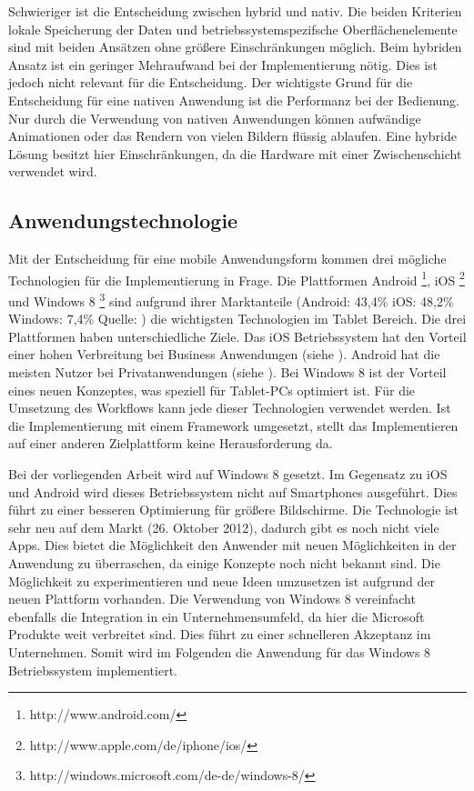 Schwieriger ist die Entscheidung zwischen hybrid und nativ. Die beiden Kriterien lokale Speicherung der Daten und betriebssystemspezifsche Oberflächenelemente sind mit beiden Ansätzen ohne größere Einschränkungen möglich. Beim hybriden Ansatz ist ein geringer Mehraufwand bei der Implementierung nötig. Dies ist jedoch nicht relevant für die Entscheidung. Der wichtigste Grund für die Entscheidung für eine nativen Anwendung ist die Performanz bei der Bedienung. Nur durch die Verwendung von nativen Anwendungen können aufwändige Animationen oder das Rendern von vielen Bildern flüssig ablaufen. Eine hybride Lösung besitzt hier Einschränkungen, da die Hardware mit einer Zwischenschicht verwendet wird.

\subsection{Anwendungstechnologie}
Mit der Entscheidung für eine mobile Anwendungsform kommen drei mögliche Technologien für die Implementierung in Frage. Die Plattformen Android \footnote{http://www.android.com/}, iOS \footnote{http://www.apple.com/de/iphone/ios/} und Windows 8 \footnote{http://windows.microsoft.com/de-de/windows-8/} sind aufgrund ihrer Marktanteile (Android: 43,4\% iOS: 48,2\% Windows: 7,4\% Quelle: \cite{bib:marktanteilBS} ) die wichtigsten Technologien im Tablet Bereich. Die drei Plattformen haben unterschiedliche Ziele. Das iOS Betriebssystem hat den Vorteil einer hohen Verbreitung bei Business Anwendungen (siehe \cite[S.5]{bib:mobileMarketing2}). Android hat die meisten Nutzer bei Privatanwendungen (siehe \cite{bib:marktanteilMBS}). Bei Windows 8 ist der Vorteil eines neuen Konzeptes, was speziell für Tablet-PCs optimiert ist. Für die Umsetzung des Workflows kann jede dieser Technologien verwendet werden. Ist die Implementierung mit einem Framework umgesetzt, stellt das Implementieren auf einer anderen Zielplattform keine Herausforderung da. \par 

Bei der vorliegenden Arbeit wird auf Windows 8 gesetzt. Im Gegensatz zu iOS und Android wird dieses Betriebssystem nicht auf Smartphones ausgeführt. Dies führt zu einer besseren Optimierung für größere Bildschirme. Die Technologie ist sehr neu auf dem Markt (26. Oktober 2012), dadurch gibt es noch nicht viele Apps. Dies bietet die Möglichkeit den Anwender mit neuen Möglichkeiten in der Anwendung zu überraschen, da einige Konzepte noch nicht bekannt sind. Die Möglichkeit zu experimentieren und neue Ideen umzusetzen ist aufgrund der neuen Plattform vorhanden.  Die Verwendung von Windows 8 vereinfacht ebenfalls die Integration in ein Unternehmensumfeld, da hier die Microsoft Produkte weit verbreitet sind. Dies führt zu einer schnelleren Akzeptanz im Unternehmen. Somit wird im Folgenden die Anwendung für das Windows 8 Betriebssystem implementiert.
        

